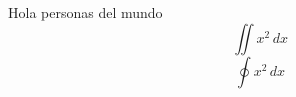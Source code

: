 \maketitle
    Hola personas del mundo 
    \[
         \iint x^2 \, dx    
    \]
    \begin{equation}
        \oint x^2 \, dx
    \end{equation}
